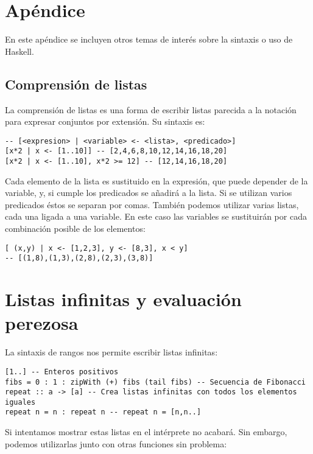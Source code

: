 \appendix

\section{Apéndice}

En este apéndice se incluyen otros temas de interés sobre la sintaxis o uso de
Haskell.

\subsection{Comprensión de listas}

La comprensión de listas es una forma de escribir listas parecida a la notación para
expresar conjuntos por extensión. Su sintaxis es:
\begin{lstlisting}
-- [<expresion> | <variable> <- <lista>, <predicado>]
[x*2 | x <- [1..10]] -- [2,4,6,8,10,12,14,16,18,20]
[x*2 | x <- [1..10], x*2 >= 12] -- [12,14,16,18,20]
\end{lstlisting}

Cada elemento de la lista es sustituido en la expresión, que puede depender de la variable, y, si
cumple los predicados se añadirá a la lista. Si se utilizan varios predicados éstos se separan por
comas. También podemos utilizar varias listas, cada una ligada a una variable. En este caso las
variables se sustituirán por cada combinación posible de los elementos:
\begin{lstlisting}
[ (x,y) | x <- [1,2,3], y <- [8,3], x < y]
-- [(1,8),(1,3),(2,8),(2,3),(3,8)]
\end{lstlisting}

\section{Listas infinitas y evaluación perezosa}
La sintaxis de rangos nos permite escribir listas infinitas:

\begin{fullwidth}
\begin{lstlisting}
[1..] -- Enteros positivos
fibs = 0 : 1 : zipWith (+) fibs (tail fibs) -- Secuencia de Fibonacci
repeat :: a -> [a] -- Crea listas infinitas con todos los elementos iguales
repeat n = n : repeat n -- repeat n = [n,n..]
\end{lstlisting}
\end{fullwidth}

Si intentamos mostrar estas listas en el intérprete no acabará. Sin embargo, podemos utilizarlas
junto con otras funciones sin problema:

